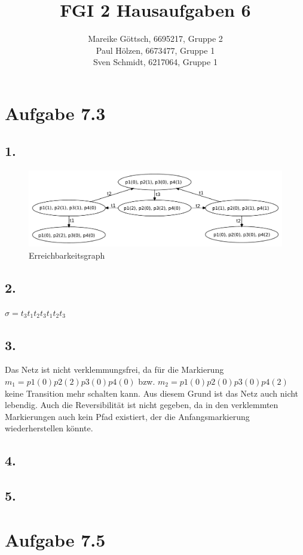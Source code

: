 \documentclass[12pt, paper=a4]{article}
\author{Mareike G\"ottsch, 6695217, Gruppe 2\\Paul H\"olzen, 6673477, Gruppe 1\\Sven Schmidt, 6217064, Gruppe 1}
\title{FGI 2 Hausaufgaben 6}
\begin{document}
\maketitle

\section*{Aufgabe 7.3}
\subsection*{1.}
\begin{figure}[h!]
\centering
\includegraphics[scale=0.6]{Erreichbarkeitsgraph7-3-1.pdf}
\caption{Erreichbarkeitsgraph}
\end{figure}

\subsection*{2.}
$\sigma = t_3t_1t_2t_3t_1t_2t_3$\\

\subsection*{3.}
Das Netz ist nicht verklemmungsfrei, da für die Markierung $m_1 = p1(0)p2(2)p3(0)p4(0)$ bzw. $m_2 = p1(0)p2(0)p3(0)p4(2)$ keine Transition mehr schalten kann. Aus diesem Grund ist das Netz auch nicht lebendig. Auch die Reversibilität ist nicht gegeben, da in den verklemmten Markierungen auch kein Pfad existiert, der die Anfangsmarkierung wiederherstellen könnte.\\

\subsection*{4.}

\subsection*{5.}

\section*{Aufgabe 7.5}
\end{document}
